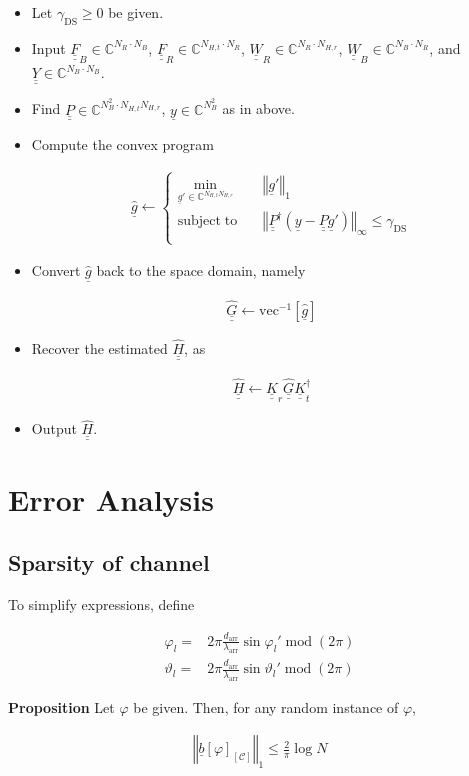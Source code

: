 \documentclass[journal]{IEEEtran}
\newcommand {\g} {\gamma}
\newcommand {\f} {\varphi}
\renewcommand {\l} {\lambda}
\renewcommand {\th} {\vartheta}
\newcommand {\D} {\cdot}
\newcommand {\m} [1] {\( #1 \)}
\newcommand {\V} [1] {\underline {#1}}
\newcommand {\M} [1] {\underline {\underline {#1}}}
\newcommand {\RB} [1] {\left( #1 \right)}
\newcommand {\SB} [1] {\left[ #1 \right]}
\newcommand {\VNm} [1] {\left \Vert #1 \right \Vert}
\newcommand {\Min} [1] {\underset {#1} {\mathrm {min}}\;}
\newcommand {\Disp} [1] {
   \begin {align*}
      #1
   \end {align*}
}
\begin{document}
\begin {itemize}
\item Let \m {\g_{\mathrm {DS}} \geq 0} be given.
\item Input \m {\M {F} _B \in \mathbb {C} ^{N_R \D N_B}},
\m {\M {F} _R \in \mathbb {C} ^{N_{H,t} \D N_R}},
\m {\M {W} _R \in \mathbb {C} ^{N_R \D N_{H,r}}},
\m {\M {W} _B \in \mathbb {C} ^{N_B \D N_R}},
and \m {\M {Y} \in \mathbb {C} ^{N_B \D N_B}}.
\item Find \m {\M {P} \in \mathbb {C} ^{N_B ^2 \D N_{H,t} N_{H,r}}}, \m {\V {y} \in \mathbb {C} ^{N_B ^2}} as in above.
\item Compute the convex program
\Disp {
\hat {\V {g}}
\leftarrow \begin {cases}
\Min {\V {g}' \in \mathbb {C} ^{N_{H,t} N_{H,r}}} & \VNm {\V {g}'} _1 \\
\mathrm {subject} \; \mathrm {to} \quad & \VNm {\M {P}^\dagger \RB {\V {y} -\M {P} \V {g}'}} _\infty \leq \g_{\mathrm {DS}} \\
\end {cases} 
}
\item Convert \m {\hat {\V {g}}} back to the space domain, namely
\Disp {
\hat {\M {G}}
\leftarrow \mathrm {vec}^{-1} \SB {\hat {\V {g}}} 
}
\item Recover the estimated \m {\hat {\M {H}}}, as
\Disp {
\hat {\M {H}}
\leftarrow \M {K} _r \hat {\M {G}} \M {K}^\dagger _t
}
\item Output \m {\hat {\M {H}}}.
\end {itemize}


\section{Error Analysis}

\subsection {Sparsity of channel}

To simplify expressions, define
%
\Disp {
\f_l
= &2\pi \frac {d_{\mathrm {arr}}} {\l_{\mathrm {arr}}} \sin \f_l'
  \; \mathrm {mod}\; \RB {2\pi} \\
%
\th_l
= &2\pi \frac {d_{\mathrm {arr}}} {\l_{\mathrm {arr}}} \sin \th_l'
  \; \mathrm {mod}\; \RB {2\pi} 
}

\textbf {Proposition}
Let \m {\f} be given.
Then, for any random instance of \m {\f},
%
\Disp {
\VNm {\V {b} \SB {\f} _{\SB{\mathcal {C}}}} _1
\leq \frac {2} {\pi} \log N 
}
\end{document}
